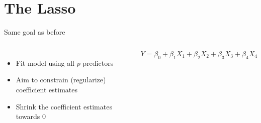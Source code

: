 \documentclass[aspectratio=169,usenames,dvipsnames]{beamer}
\newcommand{\InstructorNotes}[1]{\textit{\color{orange}#1}}
\newcommand{\InstructorList}[1]{
\begin{itemize}
	\color{orange}
	#1
\end{itemize}
}
\renewcommand{\InstructorNotes}[1]{}
\renewcommand{\InstructorList}[1]{}
\begin{document}

\section{The Lasso}

\begin{frame}[t]{Same goal as before }

\begin{columns}
\centering
\begin{itemize}
	\item Fit model using all $p$ predictors
	\item Aim to constrain (regularize) coefficient estimates
	\item Shrink the coefficient estimates towards 0 \InstructorNotes{Ridge shrunk but DID NOT GET RID OF which is what we actually want}
\end{itemize}
\centering

\begin{equation*}
	Y = \beta_0 + \beta_1 X_1 + \beta_2 X_2 + \beta_3 X_3 + \beta_4 X_4
\end{equation*}
\InstructorList{
\item Ridge regression
\item Lasso: Least Absolute Shrinkage and Selection Operator
}
\end{columns}

\end{frame}
\end{document}
